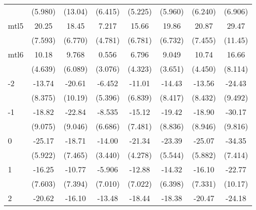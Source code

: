 \documentclass{article}
\begin{document}
{\begin{longtable}{l*{7}{c}}
                &  (5.980)         &  (13.04)         &  (6.415)         &  (5.225)         &  (5.960)         &  (6.240)         &  (6.906)         \\
mtl5            &    20.25\sym{*}  &    18.45\sym{*}  &    7.217         &    15.66\sym{*}  &    19.86\sym{*}  &    20.87\sym{*}  &    29.47\sym{*}  \\
                &  (7.593)         &  (6.770)         &  (4.781)         &  (6.781)         &  (6.732)         &  (7.455)         &  (11.45)         \\
mtl6            &    10.18\sym{*}  &    9.768         &    0.556         &    6.796         &    9.049\sym{*}  &    10.74\sym{*}  &    16.66         \\
                &  (4.639)         &  (6.089)         &  (3.076)         &  (4.323)         &  (3.651)         &  (4.450)         &  (8.114)         \\
-2              &   -13.74         &   -20.61         &   -6.452         &   -11.01         &   -14.43         &   -13.56         &   -24.43\sym{*}  \\
                &  (8.375)         &  (10.19)         &  (5.396)         &  (6.839)         &  (8.417)         &  (8.432)         &  (9.492)         \\
-1              &   -18.82         &   -22.84\sym{*}  &   -8.535         &   -15.12         &   -19.42\sym{*}  &   -18.90         &   -30.17\sym{**} \\
                &  (9.075)         &  (9.046)         &  (6.686)         &  (7.481)         &  (8.836)         &  (8.946)         &  (9.816)         \\
0               &   -25.17\sym{***}&   -18.71\sym{*}  &   -14.00\sym{**} &   -21.34\sym{***}&   -23.39\sym{***}&   -25.07\sym{***}&   -34.35\sym{***}\\
                &  (5.922)         &  (7.465)         &  (3.440)         &  (4.278)         &  (5.544)         &  (5.882)         &  (7.414)         \\
1               &   -16.25         &   -10.77         &   -5.906         &   -12.88         &   -14.32\sym{*}  &   -16.10\sym{*}  &   -22.77\sym{*}  \\
                &  (7.603)         &  (7.394)         &  (7.010)         &  (7.022)         &  (6.398)         &  (7.331)         &  (10.17)         \\
2               &   -20.62\sym{**} &   -16.10\sym{*}  &   -13.48\sym{***}&   -18.44\sym{***}&   -18.38\sym{***}&   -20.47\sym{***}&   -24.18\sym{**} \\

\end{longtable}}
\end{document}
